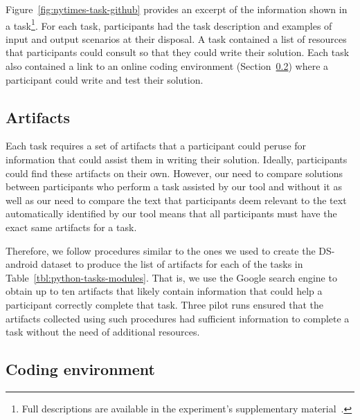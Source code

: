 Figure~\ref{fig:nytimes-task-github} provides an excerpt of the information shown in a task\footnote{Full descriptions are available in the experiment's supplementary material~.}.
For each task, participants had the task description and examples of input and output scenarios at their disposal. A task contained a list of resources that participants could consult 
so that they could write their solution.
Each task also contained a link to an online coding environment (Section~\ref{cp6:coding-environment})
where a participant could write and test their solution. 





\subsection{Artifacts}
\label{cp6:experiment-artifacts}




Each task requires a set of artifacts that a participant could peruse for information that could assist them in writing their solution.
Ideally, participants could find these artifacts on their own. However, our need to compare solutions between participants who perform a task 
assisted by our tool and without it as well as our need to compare the text that participants deem relevant to the text
automatically identified by our tool means that all participants must have the exact same artifacts for a task.


Therefore,
we follow procedures similar to the ones we used to create the \acs{DS-android} dataset to produce the list of artifacts for each of the tasks in Table~\ref{tbl:python-tasks-modules}. 
That is, we use the Google search engine to obtain up to ten artifacts that likely contain 
information that could help a participant correctly complete that task. 
Three pilot runs ensured that the artifacts collected using such procedures had sufficient information to complete a task without 
the need of additional resources. 






\subsection{Coding environment}
\label{cp6:coding-environment}



